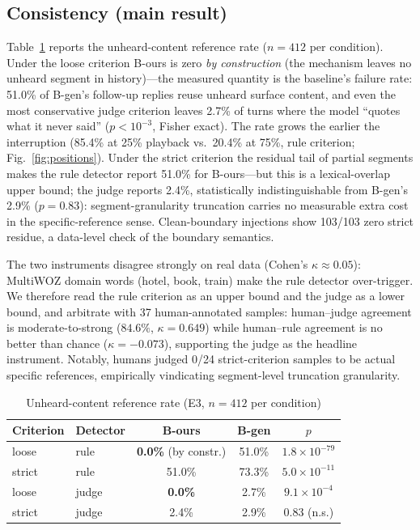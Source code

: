 \documentclass[conference]{IEEEtran}
\begin{document}
\subsection{Consistency (main result)}
Table~\ref{tab:consistency} reports the unheard-content reference rate ($n{=}412$ per condition). Under the loose criterion B-ours is zero \emph{by construction} (the mechanism leaves no unheard segment in history)---the measured quantity is the baseline's failure rate: 51.0\% of B-gen's follow-up replies reuse unheard surface content, and even the most conservative judge criterion leaves 2.7\% of turns where the model ``quotes what it never said'' ($p<10^{-3}$, Fisher exact). The rate grows the earlier the interruption (85.4\% at 25\% playback vs.\ 20.4\% at 75\%, rule criterion; Fig.~\ref{fig:positions}). Under the strict criterion the residual tail of partial segments makes the rule detector report 51.0\% for B-ours---but this is a lexical-overlap upper bound; the judge reports 2.4\%, statistically indistinguishable from B-gen's 2.9\% ($p{=}0.83$): segment-granularity truncation carries no measurable extra cost in the specific-reference sense. Clean-boundary injections show 103/103 zero strict residue, a data-level check of the boundary semantics.

The two instruments disagree strongly on real data (Cohen's $\kappa\approx0.05$): MultiWOZ domain words (hotel, book, train) make the rule detector over-trigger. We therefore read the rule criterion as an upper bound and the judge as a lower bound, and arbitrate with 37 human-annotated samples: human--judge agreement is moderate-to-strong ($84.6\%$, $\kappa=0.649$) while human--rule agreement is no better than chance ($\kappa=-0.073$), supporting the judge as the headline instrument. Notably, humans judged 0/24 strict-criterion samples to be actual specific references, empirically vindicating segment-level truncation granularity.

\begin{table}[t]
\caption{Unheard-content reference rate (E3, $n{=}412$ per condition)}
\label{tab:consistency}
\centering
\begin{tabular}{llccc}
\toprule
Criterion & Detector & B-ours & B-gen & $p$ \\
\midrule
loose & rule & \textbf{0.0\%} (by constr.) & 51.0\% & $1.8{\times}10^{-79}$ \\
strict & rule & 51.0\% & 73.3\% & $5.0{\times}10^{-11}$ \\
loose & judge & \textbf{0.0\%} & 2.7\% & $9.1{\times}10^{-4}$ \\
strict & judge & 2.4\% & 2.9\% & 0.83 (n.s.) \\
\bottomrule
\end{tabular}
\end{table}
\end{document}
